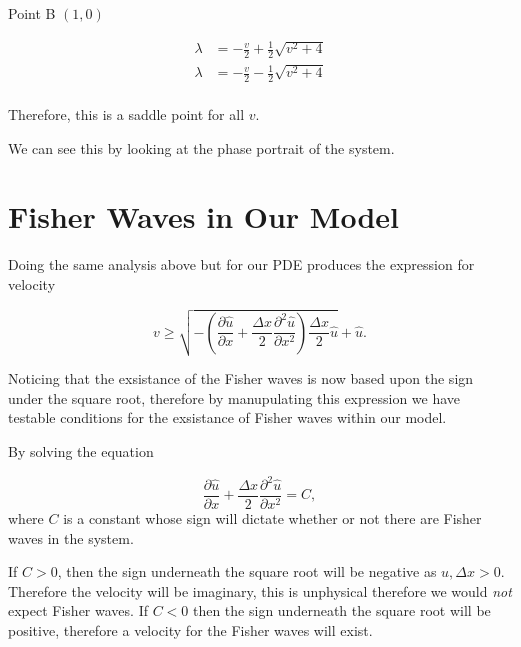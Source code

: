 \documentclass{standalone}
\begin{document}
Point B $(1,0)$

\begin{align*}
\lambda & = -\frac{v}{2} + \frac{1}{2} \sqrt{v^2 + 4} \\
\lambda & = -\frac{v}{2} - \frac{1}{2} \sqrt{v^2 + 4} \\
\end{align*}

Therefore, this is a saddle point for all $v$. 

We can see this by looking at the phase portrait of the system. 

\begin{figure}[H]
\begin{subfigure}[h]{0.5\textwidth}

\end{subfigure}
\begin{subfigure}[h]{0.5\textwidth}

\end{subfigure}
\end{figure}

\newpage

\section{Fisher Waves in Our Model}

Doing the same analysis above but for our PDE produces the expression for velocity

\begin{equation}
v \geq \sqrt{- \left( \frac{\partial \hat{u}}{\partial x} + \frac{\Delta x}{2} \frac{\partial ^2 \hat{u}}{\partial x^2} \right) \frac{\Delta x}{2} \hat{u} } + \hat{u}.
\end{equation}

Noticing that the exsistance of the Fisher waves is now based upon the sign under the square root, therefore by manupulating this expression we have testable conditions for the exsistance of Fisher waves within our model. 

By solving the equation 

\begin{equation}
\frac{\partial \hat{u}}{\partial x} + \frac{\Delta x}{2} \frac{\partial ^2 \hat{u}}{\partial x^2}  = C, 
\label{eq:CancerFisherVelocity}
\end{equation}
where $C$ is a constant whose sign will dictate whether or not there are Fisher waves in the system. 

If $C > 0$, then the sign underneath the square root will be negative as $u, \Delta x > 0 $. Therefore the velocity will be imaginary, this is unphysical therefore we would \textit{not} expect Fisher waves. 
If $C < 0 $ then the sign underneath the square root will be positive, therefore a velocity for the Fisher waves will exist. 
\end{document}
